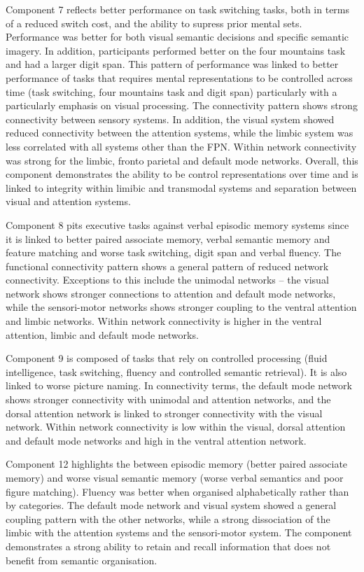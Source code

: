 Component 7 reflects better performance on task switching tasks, both in terms of a reduced switch cost, and the ability to supress prior mental sets. Performance was better for both visual semantic decisions and specific semantic imagery. In addition, participants performed better on the four mountains task and had a larger digit span. This pattern of performance was linked to better performance of tasks that requires mental representations to be controlled across time (task switching, four mountains task and digit span) particularly with a particularly emphasis on visual processing. The connectivity pattern shows strong connectivity between sensory systems. In addition, the visual system showed reduced connectivity between the attention systems, while the limbic system was less correlated with all systems other than the FPN. Within network connectivity was strong for the limbic, fronto parietal and default mode networks. Overall, this component demonstrates the ability to be control representations over time and is linked to integrity within limibic and transmodal systems and separation between visual and attention systems.

Component 8 pits executive tasks against verbal episodic memory systems since it is linked to better paired associate memory, verbal semantic memory and feature matching and worse task switching, digit span and verbal fluency. The functional connectivity pattern shows a general pattern of reduced network connectivity.  Exceptions to this include the unimodal networks – the visual network shows stronger connections to attention and default mode networks, while the sensori-motor networks shows stronger coupling to the ventral attention and limbic networks. Within network connectivity is higher in the ventral attention, limbic and default mode networks. 

Component 9 is composed of tasks that rely on controlled processing (fluid intelligence, task switching, fluency and controlled semantic retrieval). It is also linked to worse picture naming. In connectivity terms, the default mode network shows stronger connectivity with unimodal and attention networks, and the dorsal attention network is linked to stronger connectivity with the visual network. Within network connectivity is low within the visual, dorsal attention and default mode networks and high in the ventral attention network. 

Component 12 highlights the between episodic memory (better paired associate memory) and worse visual semantic memory (worse verbal semantics and poor figure matching). Fluency was better when organised alphabetically rather than by categories. The default mode network and visual system showed a general coupling pattern with the other networks, while a strong dissociation of the limbic with the attention systems and the sensori-motor system. The component demonstrates a strong ability to retain and recall information that does not benefit from semantic organisation.

